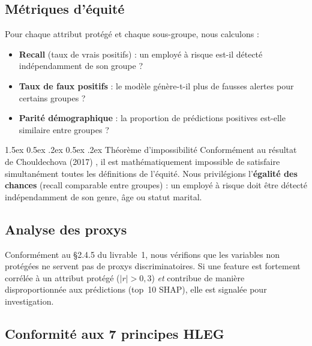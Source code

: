 \documentclass[12pt,a4paper]{article}
\makeatletter
\renewcommand\paragraph{\@startsection{paragraph}{4}{\z@}%
  {1.5ex \@plus 0.5ex \@minus .2ex}%
  {0.5ex \@plus .2ex}%
  {\normalfont\normalsize\bfseries}}
\makeatother
\begin{document}
\subsection{Métriques d'équité}

Pour chaque attribut protégé et chaque sous-groupe, nous calculons :
\begin{itemize}
    \item \textbf{Recall} (taux de vrais positifs) : un employé à risque est-il détecté indépendamment de son groupe ?
    \item \textbf{Taux de faux positifs} : le modèle génère-t-il plus de fausses alertes pour certains groupes ?
    \item \textbf{Parité démographique} : la proportion de prédictions positives est-elle similaire entre groupes ?
\end{itemize}

\paragraph{Théorème d'impossibilité} Conformément au résultat de Chouldechova (2017) \cite{chouldechova_2017}, il est mathématiquement impossible de satisfaire simultanément toutes les définitions de l'équité. Nous privilégions l'\textbf{égalité des chances} (recall comparable entre groupes) : un employé à risque doit être détecté indépendamment de son genre, âge ou statut marital.

\subsection{Analyse des proxys}

Conformément au §2.4.5 du livrable~1, nous vérifions que les variables non protégées ne servent pas de proxys discriminatoires. Si une feature est fortement corrélée à un attribut protégé ($|r| > 0{,}3$) \textit{et} contribue de manière disproportionnée aux prédictions (top~10 SHAP), elle est signalée pour investigation.

\subsection{Conformité aux 7 principes HLEG}
\end{document}
